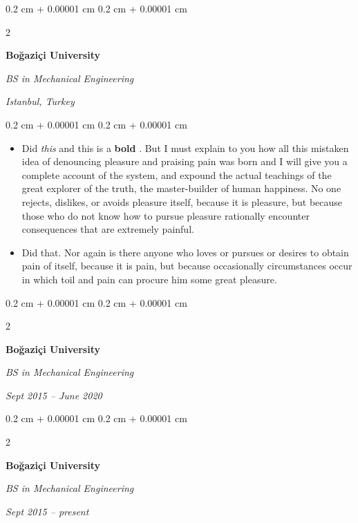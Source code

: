 \documentclass[10pt, letterpaper]{article}
\newenvironment{highlights}{
    \begin{itemize}[
        topsep=0.10 cm,
        parsep=0.10 cm,
        partopsep=0pt,
        itemsep=0pt,
        leftmargin=0.4 cm + 10pt
    ]
}{
    \end{itemize}
} %
\newenvironment{onecolentry}{
    \begin{adjustwidth}{
        0.2 cm + 0.00001 cm
    }{
        0.2 cm + 0.00001 cm
    }
}{
    \end{adjustwidth}
} %
\newenvironment{twocolentry}[2][]{
    \onecolentry
    \def\secondColumn{#2}
    \setcolumnwidth{\fill, 4.5 cm}
    \begin{paracol}{2}
}{
    \switchcolumn \raggedleft \secondColumn
    \end{paracol}
    \endonecolentry
} %
\let\hrefWithoutArrow\href
\renewcommand{\href}[2]{\hrefWithoutArrow{#1}{\ifthenelse{\equal{#2}{}}{ }{#2 }\raisebox{.15ex}{\footnotesize \faExternalLink*}}}
\begin{document}
        \vspace{0.2 cm}

        \begin{twocolentry}{
        \textit{Istanbul, Turkey}    
            
        }
            \textbf{Boğaziçi University}

            \textit{BS in Mechanical Engineering}
        \end{twocolentry}

        \vspace{0.10 cm}
        \begin{onecolentry}
            \begin{highlights}
                \item Did \textit{this} and this is a \textbf{bold} \href{https://example.com}{link}. But I must explain to you how all this mistaken idea of denouncing pleasure and praising pain was born and I will give you a complete account of the system, and expound the actual teachings of the great explorer of the truth, the master-builder of human happiness. No one rejects, dislikes, or avoids pleasure itself, because it is pleasure, but because those who do not know how to pursue pleasure rationally encounter consequences that are extremely painful.
                \item Did that. Nor again is there anyone who loves or pursues or desires to obtain pain of itself, because it is pain, but because occasionally circumstances occur in which toil and pain can procure him some great pleasure.
            \end{highlights}
        \end{onecolentry}


        \vspace{0.2 cm}

        \begin{twocolentry}{
            
            
        \textit{Sept 2015 – June 2020}}
            \textbf{Boğaziçi University}

            \textit{BS in Mechanical Engineering}
        \end{twocolentry}



        \vspace{0.2 cm}

        \begin{twocolentry}{
            
            
        \textit{Sept 2015 – present}}
            \textbf{Boğaziçi University}

            \textit{BS in Mechanical Engineering}
        \end{twocolentry}
\end{document}
